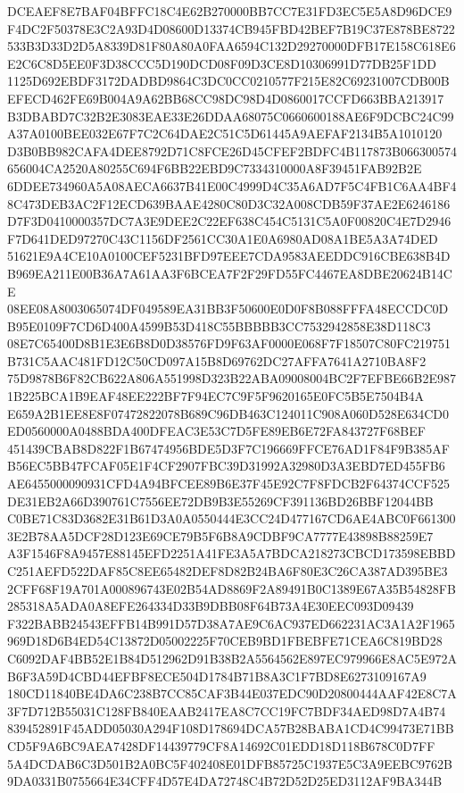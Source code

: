 \documentclass[UTF8,fontset=fandol,zihao=-4,a4paper]{ctexart}
\begin{document}
{{DCEAEF8E7BAF04BFFC18C4E62B270000BB7CC7E31FD3EC5E5A8D96DCE9F4DC2F50378E3C2A93D4D08600D13374CB945FBD42BEF7B19C37E878BE8722
533B3D33D2D5A8339D81F80A80A0FAA6594C132D29270000DFB17E158C618E6E2C6C8D5EE0F3D38CCC5D190DCD08F09D3CE8D10306991D77DB25F1DD
1125D692EBDF3172DADBD9864C3DC0CC0210577F215E82C69231007CDB00BEFECD462FE69B004A9A62BB68CC98DC98D4D0860017CCFD663BBA213917
B3DBABD7C32B2E3083EAE33E26DDAA68075C0660600188AE6F9DCBC24C99A37A0100BEE032E67F7C2C64DAE2C51C5D61445A9AEFAF2134B5A1010120
D3B0BB982CAFA4DEE8792D71C8FCE26D45CFEF2BDFC4B117873B066300574656004CA2520A80255C694F6BB22EBD9C7334310000A8F39451FAB92B2E
6DDEE734960A5A08AECA6637B41E00C4999D4C35A6AD7F5C4FB1C6AA4BF48C473DEB3AC2F12ECD639BAAE4280C80D3C32A008CDB59F37AE2E6246186
D7F3D0410000357DC7A3E9DEE2C22EF638C454C5131C5A0F00820C4E7D2946F7D641DED97270C43C1156DF2561CC30A1E0A6980AD08A1BE5A3A74DED
51621E9A4CE10A0100CEF5231BFD97EEE7CDA9583AEEDDC916CBE638B4DB969EA211E00B36A7A61AA3F6BCEA7F2F29FD55FC4467EA8DBE20624B14CE
08EE08A8003065074DF049589EA31BB3F50600E0D0F8B088FFFA48ECCDC0DB95E0109F7CD6D400A4599B53D418C55BBBBB3CC7532942858E38D118C3
08E7C65400D8B1E3E6B8D0D38576FD9F63AF0000E068F7F18507C80FC219751B731C5AAC481FD12C50CD097A15B8D69762DC27AFFA7641A2710BA8F2
75D9878B6F82CB622A806A551998D323B22ABA09008004BC2F7EFBE66B2E9871B225BCA1B9EAF48EE222BF7F94EC7C9F5F9620165E0FC5B5E7504B4A
E659A2B1EE8E8F07472822078B689C96DB463C124011C908A060D528E634CD0ED0560000A0488BDA400DFEAC3E53C7D5FE89EB6E72FA843727F68BEF
451439CBAB8D822F1B67474956BDE5D3F7C196669FFCE76AD1F84F9B385AFB56EC5BB47FCAF05E1F4CF2907FBC39D31992A32980D3A3EBD7ED455FB6
AE6455000090931CFD4A94BFCEE89B6E37F45E92C7F8FDCB2F64374CCF525DE31EB2A66D390761C7556EE72DB9B3E55269CF391136BD26BBF12044BB
C0BE71C83D3682E31B61D3A0A0550444E3CC24D477167CD6AE4ABC0F6613003E2B78AA5DCF28D123E69CE79B5F6B8A9CDBF9CA7777E43898B88259E7
A3F1546F8A9457E88145EFD2251A41FE3A5A7BDCA218273CBCD173598EBBDC251AEFD522DAF85C8EE65482DEF8D82B24BA6F80E3C26CA387AD395BE3
2CFF68F19A701A000896743E02B54AD8869F2A89491B0C1389E67A35B54828FB285318A5ADA0A8EFE264334D33B9DBB08F64B73A4E30EEC093D09439
F322BABB24543EFFB14B991D57D38A7AE9C6AC937ED662231AC3A1A2F1965969D18D6B4ED54C13872D05002225F70CEB9BD1FBEBFE71CEA6C819BD28
C6092DAF4BB52E1B84D512962D91B38B2A5564562E897EC979966E8AC5E972AB6F3A59D4CBD44EFBF8ECE504D1784B71B8A3C1F7BD8E6273109167A9
180CD11840BE4DA6C238B7CC85CAF3B44E037EDC90D20800444AAF42E8C7A3F7D712B55031C128FB840EAAB2417EA8C7CC19FC7BDF34AED98D7A4B74
839452891F45ADD05030A294F108D178694DCA57B28BABA1CD4C99473E71BBCD5F9A6BC9AEA7428DF14439779CF8A14692C01EDD18D118B678C0D7FF
5A4DCDAB6C3D501B2A0BC5F402408E01DFB85725C1937E5C3A9EEBC9762B9DA0331B0755664E34CFF4D57E4DA72748C4B72D52D25ED3112AF9BA344B
}}
\end{document}
